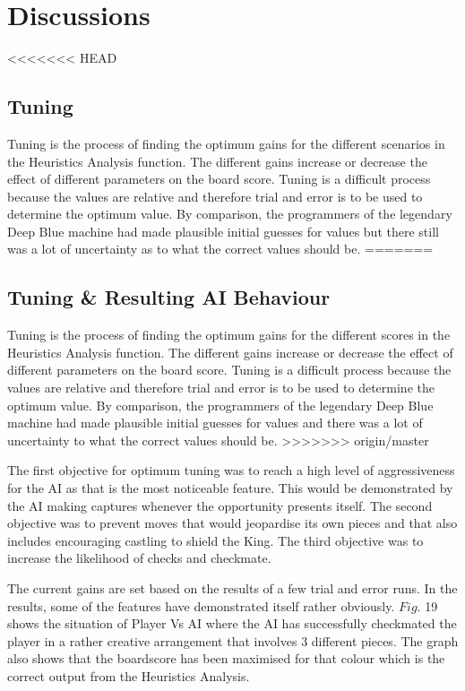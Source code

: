 \documentclass[11pt,a4paper]{article}
\begin{document}
\newpage
\section{Discussions}

<<<<<<< HEAD
\subsection{Tuning}
\indent\indent Tuning is the process of finding the optimum gains for the different scenarios in the Heuristics Analysis function. The different gains increase or decrease the effect of different parameters on the board score. Tuning is a difficult process because the values are relative and therefore trial and error is to be used to determine the optimum value. By comparison, the programmers of the legendary Deep Blue machine had made plausible initial guesses for values but there still was a lot of uncertainty as to what the correct values should be.\cite{chess5}
=======
\subsection{Tuning \& Resulting AI Behaviour}
\indent\indent Tuning is the process of finding the optimum gains for the different scores in the Heuristics Analysis function. The different gains increase or decrease the effect of different parameters on the board score. Tuning is a difficult process because the values are relative and therefore trial and error is to be used to determine the optimum value. By comparison, the programmers of the legendary Deep Blue machine had made plausible initial guesses for values and there was a lot of uncertainty to what the correct values should be.\cite{chess5}
>>>>>>> origin/master

	The first objective for optimum tuning was to reach a high level of aggressiveness for the AI as that is the most noticeable feature. This would be demonstrated by the AI making captures whenever the opportunity presents itself.  The second objective was to prevent moves that would jeopardise its own pieces and that also includes encouraging castling to shield the King. The third objective was to increase the likelihood of checks and checkmate.

	The current gains are set based on the results of a few trial and error runs. In the results, some of the features have demonstrated itself rather obviously. $Fig.$ 19 shows the situation of Player Vs AI where the AI has successfully checkmated the player in a rather creative arrangement that involves 3 different pieces. The graph also shows that the boardscore has been maximised for that colour which is the correct output from the Heuristics Analysis.
\end{document}
